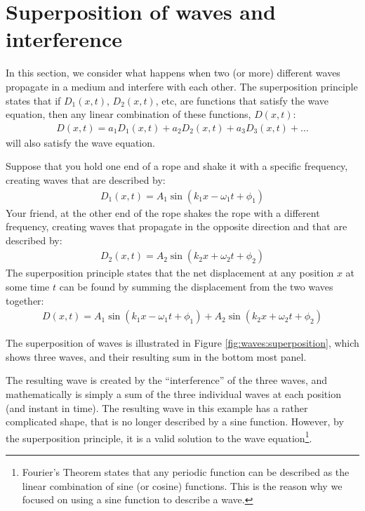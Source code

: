 \section{Superposition of waves and interference}
In this section, we consider what happens when two (or more) different waves propagate in a medium and interfere with each other. The superposition principle states that if $D_1(x,t)$, $D_2(x,t)$, etc, are functions that satisfy the wave equation, then any linear combination of these functions, $D(x,t)$:
\begin{align*}
D(x,t) = a_1D_1(x,t)+a_2D_2(x,t)+a_3D_3(x,t)+\dots
\end{align*}
will also satisfy the wave equation.

Suppose that you hold one end of a rope and shake it with a specific frequency, creating waves that are described by:
\begin{align*}
D_1(x,t) = A_1\sin(k_1x-\omega_1t+\phi_1)
\end{align*}
Your friend, at the other end of the rope shakes the rope with a different frequency, creating waves that propagate in the opposite direction and that are described by:
\begin{align*}
D_2(x,t) = A_2\sin(k_2x+\omega_2t+\phi_2)
\end{align*}
The superposition principle states that the net displacement at any position $x$ at some time $t$ can be found by summing the displacement from the two waves together:
\begin{align*}
D(x,t) = A_1\sin(k_1x-\omega_1t+\phi_1) + A_2\sin(k_2x+\omega_2t+\phi_2)
\end{align*}

The superposition of waves is illustrated in Figure \ref{fig:waves:superposition}, which shows three waves, and their resulting sum in the bottom most panel.

The resulting wave is created by the ``interference'' of the three waves, and mathematically is simply a sum of the three individual waves at each position (and instant in time). The resulting wave in this example has a rather complicated shape, that is no longer described by a sine function. However, by the superposition principle, it is a valid solution to the wave equation\footnote{Fourier's Theorem states that any periodic function can be described as the linear combination of sine (or cosine) functions. This is the reason why we focused on using a sine function to describe a wave.}.


